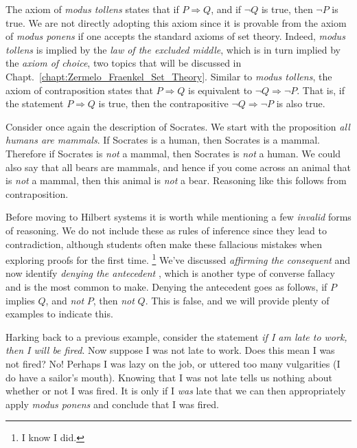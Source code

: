         The axiom of \textit{modus tollens} states that if
        $P\Rightarrow{Q}$, and if $\neg{Q}$ is true, then $\neg{P}$ is true. We
        are not directly adopting this axiom since it is provable from the
        axiom of \textit{modus ponens} if one accepts the standard axioms of set
        theory. Indeed, \textit{modus tollens} is implied by the
        \textit{law of the excluded middle},
        which is in turn implied by the
        \textit{axiom of choice}, two topics that will be
        discussed in Chapt.~\ref{chapt:Zermelo_Fraenkel_Set_Theory}. Similar to
        \textit{modus tollens}, the axiom of contraposition states that
        $P\Rightarrow{Q}$ is equivalent to $\neg{Q}\Rightarrow\neg{P}$. That is,
        if the statement $P\Rightarrow{Q}$ is true, then the contrapositive
        $\neg{Q}\Rightarrow\neg{P}$ is also true.
        \begin{example}
            Consider once again the description of Socrates. We start with the
            proposition \textit{all humans are mammals}. If Socrates is a human,
            then Socrates is a mammal. Therefore if Socrates is \textit{not} a
            mammal, then Socrates is \textit{not} a human. We could also say
            that all bears are mammals, and hence if you come across an animal
            that is \textit{not} a mammal, then this animal is \textit{not} a
            bear. Reasoning like this follows from contraposition.
        \end{example}
        Before moving to Hilbert systems it is worth while mentioning a few
        \textit{invalid} forms of reasoning. We do not include these as rules of
        inference since they lead to contradiction, although students often make
        these fallacious mistakes when exploring proofs for the first time.%
        \footnote{%
            I know I did.
        }
        We've discussed \textit{affirming the consequent} and now identify
        \textit{denying the antecedent}%
        , which is another type of
        converse fallacy and is the most common to make. Denying the antecedent
        goes as follows, if $P$ implies $Q$, and \textit{not} $P$, then
        \textit{not} $Q$. This is false, and we will provide plenty of examples
        to indicate this.
        \begin{example}
            Harking back to a previous example, consider the statement
            \textit{if I am late to work, then I will be fired}. Now suppose I
            was not late to work. Does this mean I was not fired? No! Perhaps I
            was lazy on the job, or uttered too many vulgarities (I do have a
            sailor's mouth). Knowing that I was not late tells us nothing about
            whether or not I was fired. It is only if I \textit{was} late that
            we can then appropriately apply \textit{modus ponens} and conclude
            that I was fired.
        \end{example}
